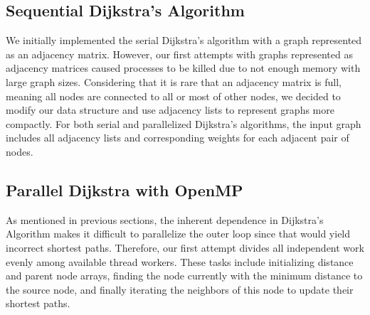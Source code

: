 \documentclass[12pt]{article}
\begin{document}
\subsection{Sequential Dijkstra's Algorithm}
We initially implemented the serial Dijkstra's algorithm with a graph represented as an adjacency matrix. However, our first attempts with graphs represented as adjacency matrices caused processes to be killed due to not enough memory with large graph sizes. Considering that it is rare that an adjacency matrix is full, meaning all nodes are connected to all or most of other nodes, we decided to modify our data structure and use adjacency lists to represent graphs more compactly. For both serial and parallelized Dijkstra's algorithms, the input graph includes all adjacency lists and corresponding weights for each adjacent pair of nodes.

\subsection{Parallel Dijkstra with OpenMP}
As mentioned in previous sections, the inherent dependence in Dijkstra's Algorithm makes it difficult to parallelize the outer loop since that would yield incorrect shortest paths. Therefore, our first attempt divides all independent work evenly among available thread workers. These tasks include initializing distance and parent node arrays, finding the node currently with the minimum distance to the source node, and finally iterating the neighbors of this node to update their shortest paths.\\
\end{document}
